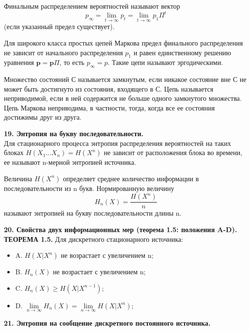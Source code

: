 \documentclass[14pt]{article}
\begin{document}
Финальным распределением вероятностей называют вектор
\begin{displaymath}
    \textbf{\(p_{\infty}\)} = \lim\limits_{t \to \infty} \textbf{$p_t$} = \lim\limits_{t \to \infty} \textbf{$p_1$} \Pi^t
\end{displaymath}
(если указанный предел существует).

Для широкого класса простых цепей Маркова предел финального распределения не зависит от начального распределения \(p_1\) и равен единственному решению уравнения \(\textbf{p} = \textbf{p}\Pi\), то есть \(p_{\infty} = p\). Такие цепи называют эргодическими.

Множество состояний С называется замкнутым, если никакое состояние вне С не может быть достигнуто из состояния, входящего в С. Цепь называется неприводимой, если в ней содержится не больше одного замкнутого множества. Цепь Маркова неприводима, в частности, тогда, когда все ее состояния достижимы друг из друга.

\bigskip
\textbf{19. Энтропия на букву последовательности.} \\

Для стационарного процесса энтропия распределения вероятностей на таких блоках \( H(X_1...X_n) = H(X^n)\) не зависит от расположения блока во времени, ее называют n-мерной энтропией источника.

Величина \(H(X^n)\) определяет среднее количество информации в последовательности из n букв. Нормированную величину
\begin{displaymath}
    H_n(X) = \frac{H(X^n)}{n}
\end{displaymath}
называют энтропией на букву последовательности длины n.

\bigskip
\textbf{20. Свойства двух информационных мер (теорема 1.5: положения A-D).} \\

\textbf{ТЕОРЕМА 1.5.} Для дискретного стационарного источника:
\begin{itemize}
    \item A. \(H(X|X^n)\) не возрастает с увеличением n;
    \item B. \(H_n(X)\) не возрастает с увеличением n;
    \item C. \(H_n(X) \geq H(X|X^{n-1})\);
    \item D. \( \lim\limits_{n \to \infty} H_n(X) = \lim\limits_{n \to \infty} H(X|X^n)\);
\end{itemize}

\bigskip
\textbf{21. Энтропия на сообщение дискретного постоянного источника.} \\
\end{document}
